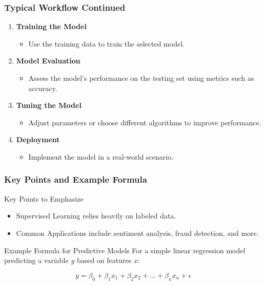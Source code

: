 \documentclass[aspectratio=169]{beamer}
\begin{document}
\begin{frame}[fragile]
    \frametitle{Typical Workflow Continued}
    \begin{enumerate}[resume]
        \item \textbf{Training the Model}
            \begin{itemize}
                \item Use the training data to train the selected model.
            \end{itemize}
        \item \textbf{Model Evaluation}
            \begin{itemize}
                \item Assess the model's performance on the testing set using metrics such as accuracy.
            \end{itemize}
        \item \textbf{Tuning the Model}
            \begin{itemize}
                \item Adjust parameters or choose different algorithms to improve performance.
            \end{itemize}
        \item \textbf{Deployment}
            \begin{itemize}
                \item Implement the model in a real-world scenario.
            \end{itemize}
    \end{enumerate}
\end{frame}

\begin{frame}[fragile]
    \frametitle{Key Points and Example Formula}
    \begin{block}{Key Points to Emphasize}
        \begin{itemize}
            \item Supervised Learning relies heavily on labeled data.
            \item Common Applications include sentiment analysis, fraud detection, and more.
        \end{itemize}
    \end{block}
    \begin{block}{Example Formula for Predictive Models}
        For a simple linear regression model predicting a variable \( y \) based on features \( x \):

        \begin{equation}
            y = \beta_0 + \beta_1 x_1 + \beta_2 x_2 + \ldots + \beta_n x_n + \epsilon 
        \end{equation}
    \end{block}
\end{frame}
\end{document}
